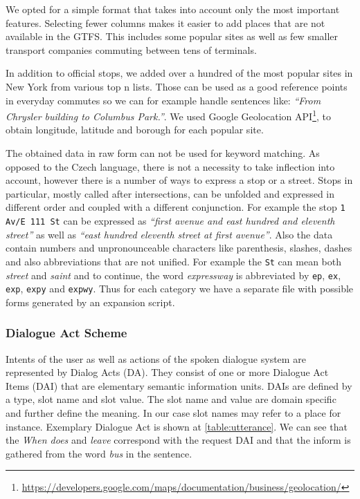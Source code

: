 We opted for a simple format that takes into account only the most important features.
Selecting fewer columns makes it easier to add places that are not available in the GTFS.
This includes some popular sites as well as few smaller transport companies commuting between tens of terminals.

In addition to official stops, we added over a hundred of the most popular sites in New York from various top n lists.
Those can be used as a good reference points in everyday commutes so we can for example handle sentences like:
\textit{``From Chrysler building to Columbus Park.''}.
We used Google Geolocation API\footnote{\url{https://developers.google.com/maps/documentation/business/geolocation/}}, to obtain longitude, latitude and borough for each popular site.

The obtained data in raw form can not be used for keyword matching. As opposed to the Czech language, there is not a necessity to take inflection into account, however there is a number of ways to express a stop or a street.
Stops in particular, mostly called after intersections, can be unfolded and expressed in different order and coupled with a different conjunction.
For example the stop \texttt{1 Av/E 111 St} can be expressed as \textit{``first avenue and east hundred and eleventh street''} as well as \textit{``east hundred eleventh street at first avenue''}.
Also the data contain numbers and unpronounceable characters like parenthesis, slashes, dashes and also abbreviations that are not unified.
For example the \texttt{St} can mean both \textit{street} and \textit{saint} and to continue, the word \textit{expressway} is abbreviated by \texttt{ep}, \texttt{ex}, \texttt{exp}, \texttt{expy} and \texttt{expwy}.
Thus for each category we have a separate file with possible forms generated by an expansion script.


\subsubsection{Dialogue Act Scheme}

Intents of the user as well as actions of the spoken dialogue system are represented by Dialog Acts (DA).
They consist of one or more Dialogue Act Items (DAI) that are elementary semantic information units.
DAIs are defined by a type, slot name and slot value.
The slot name and value are domain specific and further define the meaning.
In our case slot names may refer to a place for instance.
Exemplary Dialogue Act is shown at \ref{table:utterance}. We can see that the \textit{When does} and \textit{leave} correspond with the request DAI and that the inform is gathered from the word \textit{bus} in the sentence.

